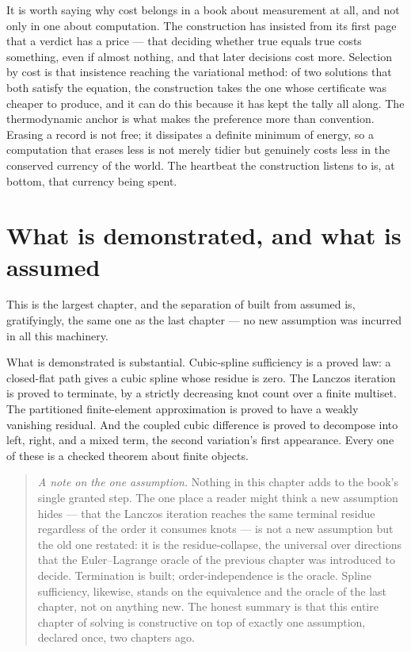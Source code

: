 It is worth saying why cost belongs in a book about measurement at all, and not only in one about
computation. The construction has insisted from its first page that a verdict has a price --- that
deciding whether true equals true costs something, even if almost nothing, and that later decisions
cost more. Selection by cost is that insistence reaching the variational method: of two solutions that
both satisfy the equation, the construction takes the one whose certificate was cheaper to produce, and
it can do this because it has kept the tally all along. The thermodynamic anchor is what makes the
preference more than convention. Erasing a record is not free; it dissipates a definite minimum of
energy, so a computation that erases less is not merely tidier but genuinely costs less in the conserved
currency of the world. The heartbeat the construction listens to is, at bottom, that currency being
spent.

\section{What is demonstrated, and what is assumed}
\label{se:demonstrated-assumed-ch11}

This is the largest chapter, and the separation of built from assumed is, gratifyingly, the same one as
the last chapter --- no new assumption was incurred in all this machinery.

What is demonstrated is substantial. Cubic-spline sufficiency is a proved law: a closed-flat path gives
a cubic spline whose residue is zero. The Lanczos iteration is proved to terminate, by a strictly
decreasing knot count over a finite multiset. The partitioned finite-element approximation is proved to
have a weakly vanishing residual. And the coupled cubic difference is proved to decompose into left,
right, and a mixed term, the second variation's first appearance. Every one of these is a checked
theorem about finite objects.

\begin{quote}
\emph{A note on the one assumption.} Nothing in this chapter adds to the book's single granted step. The
one place a reader might think a new assumption hides --- that the Lanczos iteration reaches the same
terminal residue regardless of the order it consumes knots --- is not a new assumption but the old one
restated: it is the residue-collapse, the universal over directions that the Euler--Lagrange oracle of
the previous chapter was introduced to decide. Termination is built; order-independence is the oracle.
Spline sufficiency, likewise, stands on the equivalence and the oracle of the last chapter, not on
anything new. The honest summary is that this entire chapter of solving is constructive on top of
exactly one assumption, declared once, two chapters ago.
\end{quote}

